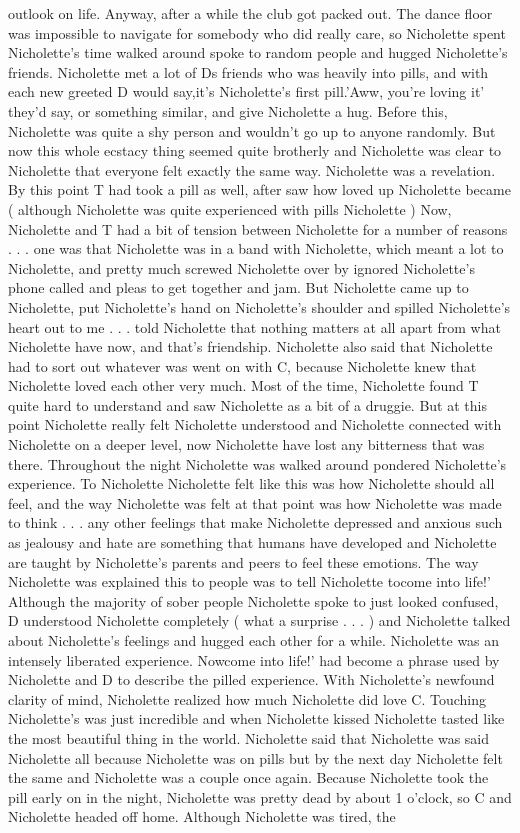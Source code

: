 \documentclass[12pt]{book}
\begin{document}
outlook on life. Anyway, after a while the club got packed out. The dance floor was impossible to navigate for somebody who did really care, so Nicholette spent Nicholette's time walked around spoke to random people and hugged Nicholette's friends. Nicholette met a lot of Ds friends who was heavily into pills, and with each new greeted D would say,it's Nicholette's first pill.'Aww, you're loving it' they'd say, or something similar, and give Nicholette a hug. Before this, Nicholette was quite a shy person and wouldn't go up to anyone randomly. But now this whole ecstacy thing seemed quite brotherly and Nicholette was clear to Nicholette that everyone felt exactly the same way. Nicholette was a revelation. By this point T had took a pill as well, after saw how loved up Nicholette became ( although Nicholette was quite experienced with pills Nicholette ) Now, Nicholette and T had a bit of tension between Nicholette for a number of reasons . . .  one was that Nicholette was in a band with Nicholette, which meant a lot to Nicholette, and pretty much screwed Nicholette over by ignored Nicholette's phone called and pleas to get together and jam. But Nicholette came up to Nicholette, put Nicholette's hand on Nicholette's shoulder and spilled Nicholette's heart out to me . . .  told Nicholette that nothing matters at all apart from what Nicholette have now, and that's friendship. Nicholette also said that Nicholette had to sort out whatever was went on with C, because Nicholette knew that Nicholette loved each other very much. Most of the time, Nicholette found T quite hard to understand and saw Nicholette as a bit of a druggie. But at this point Nicholette really felt Nicholette understood and Nicholette connected with Nicholette on a deeper level, now Nicholette have lost any bitterness that was there. Throughout the night Nicholette was walked around pondered Nicholette's experience. To Nicholette Nicholette felt like this was how Nicholette should all feel, and the way Nicholette was felt at that point was how Nicholette was made to think . . .  any other feelings that make Nicholette depressed and anxious such as jealousy and hate are something that humans have developed and Nicholette are taught by Nicholette's parents and peers to feel these emotions. The way Nicholette was explained this to people was to tell Nicholette tocome into life!' Although the majority of sober people Nicholette spoke to just looked confused, D understood Nicholette completely ( what a surprise . . .  ) and Nicholette talked about Nicholette's feelings and hugged each other for a while. Nicholette was an intensely liberated experience. Nowcome into life!' had become a phrase used by Nicholette and D to describe the pilled experience. With Nicholette's newfound clarity of mind, Nicholette realized how much Nicholette did love C. Touching Nicholette's was just incredible and when Nicholette kissed Nicholette tasted like the most beautiful thing in the world. Nicholette said that Nicholette was said Nicholette all because Nicholette was on pills but by the next day Nicholette felt the same and Nicholette was a couple once again. Because Nicholette took the pill early on in the night, Nicholette was pretty dead by about 1 o'clock, so C and Nicholette headed off home. Although Nicholette was tired, the 
\end{document}
